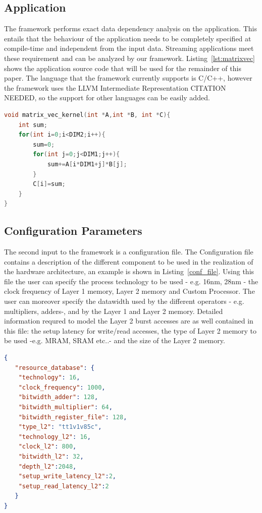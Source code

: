 \subsection{Application}
\label{ssec:app}
The framework performs exact data dependency analysis on the application. This entails that the behaviour of the application needs to be completely specified at compile-time and independent from the input data. Streaming applications meet these requirement and can be analyzed by our framework. Listing~\ref{lst:matrixvec} shows the application source code that will be used for the remainder of this paper. The language that the framework currently supports is C/C++, however the framework uses the LLVM Intermediate Representation CITATION NEEDED, so the support for other languages can be easily added.
\begin{lstlisting}[language=C, caption={Example of input application, C implementation of a matrix vector multiplication.}, label={lst:matrixvec}]
void matrix_vec_kernel(int *A,int *B, int *C){
    int sum;
    for(int i=0;i<DIM2;i++){
        sum=0;
        for(int j=0;j<DIM1;j++){
            sum+=A[i*DIM1+j]*B[j];
        }
        C[i]=sum;
    }
}
\end{lstlisting}

\subsection{Configuration Parameters}
\label{ssec:conf_param}
The second input to the framework is a configuration file. The Configuration file contains a description of the different component to be used in the realization of the hardware architecture, an example is shown in Listing~\ref{conf_file}. Using this file the user can specify the process technology to be used - e.g. 16nm, 28nm - the clock frequency of Layer 1 memory, Layer 2 memory and Custom Processor. The user can moreover specify the datawidth used by the different operators - e.g. multipliers, adders-, and by the Layer 1 and Layer 2 memory. 
Detailed information requred to model the Layer 2 burst accesses are as well contained in this file: the setup latency for write/read accesses, the type of Layer 2 memory to be used -e.g. MRAM, SRAM etc..- and the size of the Layer 2 memory.
\begin{lstlisting}[language=json, caption={Example of input configuration file}, label={lst:conf_file}]
{ 
   "resource_database": { 
	"technology": 16, 
	"clock_frequency": 1000, 
	"bitwidth_adder": 128, 
	"bitwidth_multiplier": 64, 
	"bitwidth_register_file": 128, 
	"type_l2": "tt1v1v85c", 
	"technology_l2": 16, 
	"clock_l2": 800, 
	"bitwidth_l2": 32, 
	"depth_l2":2048, 
	"setup_write_latency_l2":2, 
	"setup_read_latency_l2":2 
   } 
}

\end{lstlisting}

